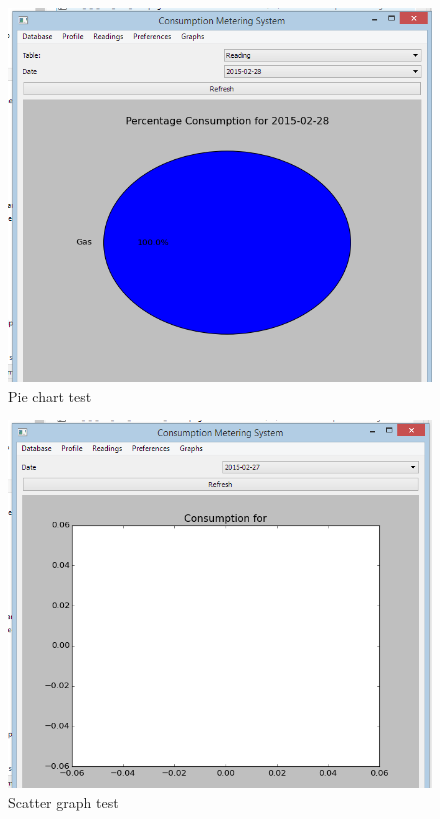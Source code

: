\begin{figure}[H]
	\includegraphics{./testing/images/test_5_2_piechart.png}
	\caption{Pie chart test} \label{fig:test_5.2_results}
\end{figure}

\begin{figure}[H]
	\includegraphics{./testing/images/test_5_3_scattergraph.png}
	\caption{Scatter graph test} \label{fig:test_5.3_results}
\end{figure}

